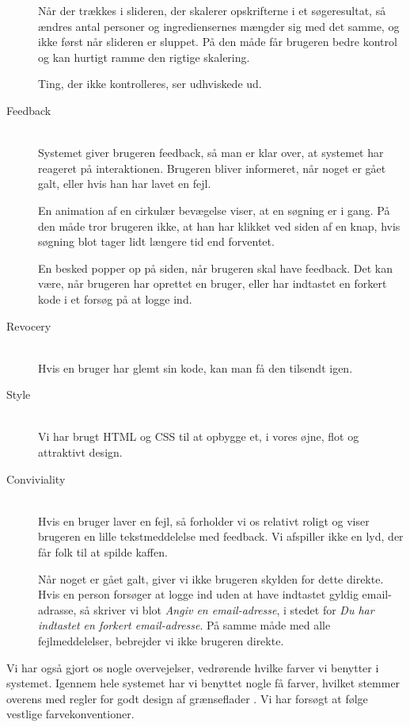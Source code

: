 \begin{description}
Når der trækkes i slideren, der skalerer opskrifterne i et søgeresultat, så ændres antal personer og ingrediensernes mængder sig med det samme, og ikke først når slideren er sluppet. På den måde får brugeren bedre kontrol og kan hurtigt ramme den rigtige skalering.

Ting, der ikke kontrolleres, ser udhviskede ud. 

\item[Feedback] \hfill \\
Systemet giver brugeren feedback, så man er klar over, at systemet har reageret på interaktionen. Brugeren bliver informeret, når noget er gået galt, eller hvis han har lavet en fejl.

En animation af en cirkulær bevægelse viser, at en søgning er i gang. På den måde tror brugeren ikke, at han har klikket ved siden af en knap, hvis søgning blot tager lidt længere tid end forventet.

En besked popper op på siden, når brugeren skal have feedback. Det kan \fx være, når brugeren har oprettet en bruger, eller har indtastet en forkert kode i et forsøg på at logge ind.

\item[Revocery] \hfill \\
Hvis en bruger har glemt sin kode, kan man få den tilsendt igen.

\item[Style] \hfill \\
Vi har brugt HTML og CSS til at opbygge et, i vores øjne, flot og attraktivt design.

\item[Conviviality] \hfill \\
Hvis en bruger laver en fejl, så forholder vi os relativt roligt og viser brugeren en lille tekstmeddelelse med feedback. Vi afspiller ikke en lyd, der får folk til at spilde kaffen.

Når noget er gået galt, giver vi ikke brugeren skylden for dette direkte. Hvis en person forsøger at logge ind uden at have indtastet gyldig email-adrasse, så skriver vi blot \textit{Angiv en email-adresse}, i stedet for \textit{Du har indtastet en forkert email-adresse}. På samme måde med alle fejlmeddelelser, bebrejder vi ikke brugeren direkte.
\end{description}

Vi har også gjort os nogle overvejelser, vedrørende hvilke farver vi benytter i systemet. Igennem hele systemet har vi benyttet nogle få farver, hvilket stemmer overens med regler for godt design af grænseflader \cite[p. ~344]{deb}. Vi har forsøgt at følge vestlige farvekonventioner. 

